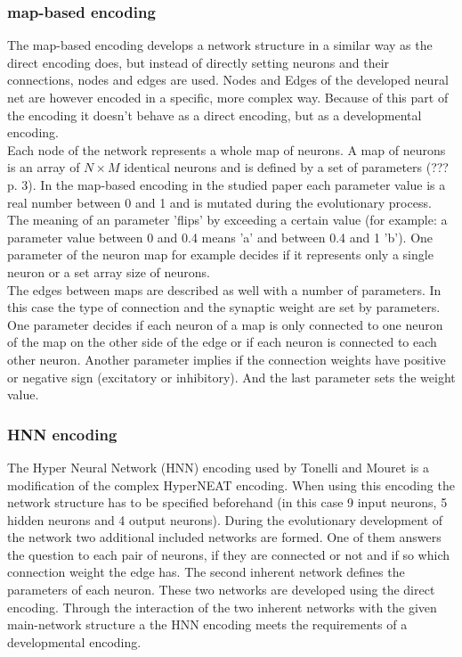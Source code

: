 \documentclass[12pt,twoside]{article}
\theoremstyle{plain}
\theoremstyle{definition}
\theoremstyle{remark}
\begin{document}
\subsubsection{map-based encoding}
The map-based encoding develops a network structure in a similar way as the direct encoding does, but instead of directly setting neurons and their connections, nodes and edges are used.
Nodes and Edges of the developed neural net are however encoded in a specific, more complex way. Because of this part of the encoding it doesn't behave as a direct encoding, but as a developmental encoding.\\
Each node of the network represents a whole map of neurons. A map of neurons is an array of $N \times M$ identical neurons and is defined by a set of parameters (??? \cite{tonelli2011using} p. 3). 
In the map-based encoding in the studied paper each parameter value is a real number between 0 and 1 and is mutated during the evolutionary process.
The meaning of an parameter 'flips' by exceeding a certain value (for example: a parameter value between 0 and 0.4 means 'a' and between 0.4 and 1 'b').
One parameter of the neuron map for example decides if it represents only a single neuron or a set array size of neurons.\\
The edges between maps are described as well with a number of parameters.
In this case the type of connection and the synaptic weight are set by parameters.
One parameter decides if each neuron of a map is only connected to one neuron of the map on the other side of the edge or if each neuron is connected to each other neuron.
Another parameter implies if the connection weights have positive or negative sign (excitatory or inhibitory). And the last parameter sets the weight value.

\subsubsection{HNN encoding}
The Hyper Neural Network (HNN) encoding used by Tonelli and Mouret is a modification of the complex HyperNEAT encoding.
When using this encoding the network structure has to be specified beforehand (in this case 9 input neurons, 5 hidden neurons and 4 output neurons).
During the evolutionary development of the network two additional included networks are formed. One of them answers the question to each pair of neurons, if they are connected or not and if so which connection weight the edge has.
The second inherent network defines the parameters of each neuron. These two networks are developed using the direct encoding.
Through the interaction of the two inherent networks with the given main-network structure a the HNN encoding meets the requirements of a developmental encoding.
\end{document}
